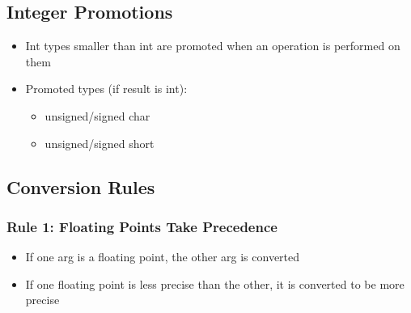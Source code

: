\documentclass[11pt,a4paper]{article}
\begin{document}
\subsection{Integer Promotions}

\begin{itemize}
    \item Int types smaller than int are promoted when an operation is performed on them
    \item Promoted types (if result is int):
    \begin{itemize}
        \item unsigned/signed char
        \item unsigned/signed short
    \end{itemize}
\end{itemize}

\subsection{Conversion Rules}

\subsubsection{Rule 1: Floating Points Take Precedence}
\begin{itemize}
    \item If one arg is a floating point, the other arg is converted
    \item If one floating point is less precise than the other, it is converted to be more precise
\end{itemize}
\end{document}
